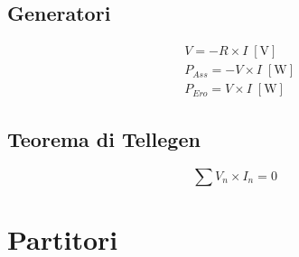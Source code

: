 \documentclass{article}
\begin{document}
        \begin{minipage}[t]{.3\textwidth}
            \vspace{-\baselineskip}

            \subsection*{Generatori}
            
                \begin{minipage}[t]{.2\textwidth}
                    \vspace{-\baselineskip}

                    
                \end{minipage}
                \hfill
                \begin{minipage}[t]{.8\textwidth}
                    \vspace{-1.5\baselineskip}

                    \begin{align*}
                        &V = - R \times I \; [\mathrm{V}]\\
                        &P_{Ass} = - V \times I \; [\mathrm{W}]\\
                        &P_{Ero} = V \times I \; [\mathrm{W}]
                    \end{align*}
                \end{minipage}

        \end{minipage}
        \hfill
        \begin{minipage}[t]{.3\textwidth}
            \vspace{-\baselineskip}

            \subsection*{Teorema di Tellegen}

                \[
                    \sum V_n \times I_n = 0
                \]

        \end{minipage}

    \vspace{-\baselineskip}
    \section*{Partitori}
\end{document}
